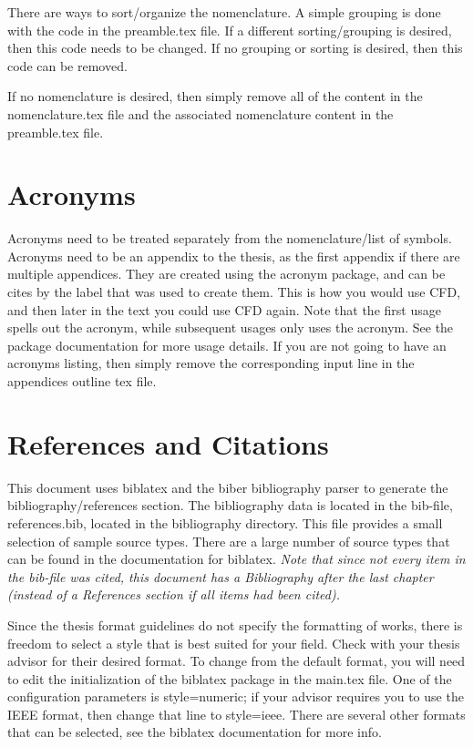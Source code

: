     There are ways to sort/organize the nomenclature.
    A simple grouping is done with the code in the preamble.tex file.
    If a different sorting/grouping is desired, then this code needs to be changed.
    If no grouping or sorting is desired, then this code can be removed.

    If no nomenclature is desired, then simply remove all of the content in the nomenclature.tex file and the associated nomenclature content in the preamble.tex file.

\section{Acronyms}
    Acronyms need to be treated separately from the nomenclature/list of symbols.
    Acronyms need to be an appendix to the thesis, as the first appendix if there are multiple appendices.
    They are created using the acronym package, and can be cites by the label that was used to create them.
    This is how you would use \ac{CFD}, and then later in the text you could use \ac{CFD} again.
    Note that the first usage spells out the acronym, while subsequent usages only uses the acronym.
    See the package documentation for more usage details.
    If you are not going to have an acronyms listing, then simply remove the corresponding input line in the appendices outline tex file.

\section{References and Citations} \label{sec:Citations}
    This document uses biblatex and the biber bibliography parser to generate the bibliography/references section.
    The bibliography data is located in the bib-file, references.bib, located in the bibliography directory.
    This file provides a small selection of sample source types.
    There are a large number of source types that can be found in the documentation for biblatex.
    \emph{Note that since not every item in the bib-file was cited, this document has a Bibliography after the last chapter (instead of a References section if all items had been cited).}

    Since the thesis format guidelines do not specify the formatting of works, there is freedom to select a style that is best suited for your field.
    Check with your thesis advisor for their desired format.
    To change from the default format, you will need to edit the initialization of the biblatex package in the main.tex file.
    One of the configuration parameters is style=numeric; if your advisor requires you to use the IEEE format, then change that line to style=ieee.
    There are several other formats that can be selected, see the biblatex documentation for more info.

